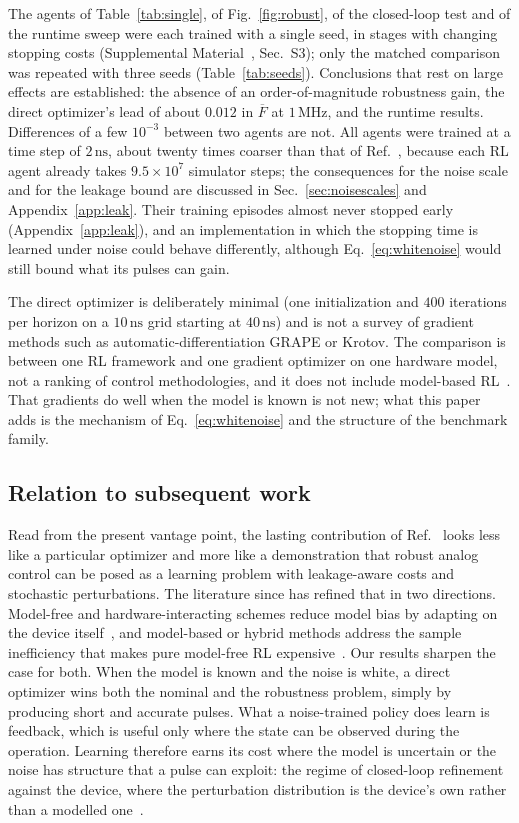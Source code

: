\documentclass[aps,prx,twocolumn,superscriptaddress,nofootinbib,amsmath,amssymb,floatfix]{revtex4-2}
\newcommand{\Fbar}{\overline{F}}
\newcommand{\ns}{\,\mathrm{ns}}
\newcommand{\MHz}{\,\mathrm{MHz}}
\begin{document}
The agents of Table~\ref{tab:single}, of Fig.~\ref{fig:robust}, of the closed-loop test and of the runtime
sweep were each trained with a single seed, in stages with changing stopping costs
(Supplemental Material~\cite{supp}, Sec.~S3); only the matched comparison was repeated with three seeds
(Table~\ref{tab:seeds}). Conclusions that rest on large effects are established: the absence of an
order-of-magnitude robustness gain, the direct optimizer's lead of about $0.012$ in $\Fbar$ at $1\MHz$,
and the runtime results. Differences of a few $10^{-3}$ between two agents are not. All agents were
trained at a time step of $2\ns$, about twenty times coarser than that of Ref.~\cite{Niu2019}, because
each RL agent already takes $9.5\times10^7$ simulator steps; the consequences for the noise scale and
for the leakage bound are discussed in Sec.~\ref{sec:noisescales} and Appendix~\ref{app:leak}. Their
training episodes almost never stopped early (Appendix~\ref{app:leak}), and an implementation in which the stopping time is learned
under noise could behave differently, although Eq.~\eqref{eq:whitenoise} would still bound what its pulses
can gain.

The direct optimizer is deliberately minimal (one initialization and $400$ iterations per horizon on a
$10\ns$ grid starting at $40\ns$) and is not a survey of gradient methods such as
automatic-differentiation GRAPE or Krotov. The comparison is between one RL framework and one gradient
optimizer on one hardware model, not a ranking of control methodologies, and it does not include
model-based RL~\cite{Khalid2023}. That gradients do well when the model is known is not new; what this
paper adds is the mechanism of Eq.~\eqref{eq:whitenoise} and the structure of the benchmark family.

\subsection{Relation to subsequent work}

Read from the present vantage point, the lasting contribution of Ref.~\cite{Niu2019} looks less like a
particular optimizer and more like a demonstration that robust analog control can be posed as a learning
problem with leakage-aware costs and stochastic perturbations. The literature since has refined that in two
directions. Model-free and hardware-interacting schemes reduce model bias by adapting on the device
itself~\cite{Sivak2022}, and model-based or hybrid methods address the sample inefficiency that makes pure
model-free RL expensive~\cite{Khalid2023}. Our results sharpen the case for both. When the model is known
and the noise is white, a direct optimizer wins both the nominal and the robustness problem, simply by
producing short and accurate pulses. What a noise-trained policy does learn is feedback, which is useful
only where the state can be observed during the operation. Learning therefore earns its cost where the
model is uncertain or the noise has structure that a pulse can exploit: the regime of closed-loop
refinement against the device, where the perturbation distribution is the device's own rather than a
modelled one~\cite{Vetter2024,Glaser2025,Wang2024}.
\end{document}
